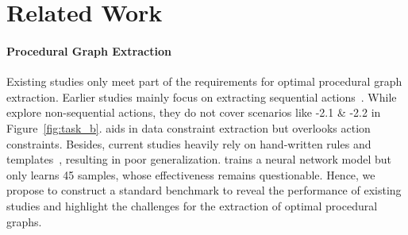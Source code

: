 

\section{Related Work}
\paragraph{Procedural Graph Extraction} 
Existing studies only meet part of the requirements for optimal procedural graph extraction. 
Earlier studies mainly focus on extracting sequential actions~\cite{pal2021constructing, lopez2021declarative, ren2023constructing}. 
While \citet{epure2015automatic, honkisz2018concept, bellan2022pet} explore non-sequential actions, they do not cover scenarios like \uppercase\expandafter{}-2.1 \& \uppercase\expandafter{}-2.2 in Figure~\ref{fig:task_b}. \citet{friedrich2011process} aids in data constraint extraction but overlooks action constraints. 
Besides, current studies heavily rely on hand-written rules and templates~\cite{epure2015automatic, honkisz2018concept}, resulting in poor generalization. \citet{bellan2022pet} trains a neural network model but only learns 45 samples, whose effectiveness remains questionable. 
Hence, we propose to construct a standard benchmark to reveal the performance of existing studies and highlight the challenges for the extraction of optimal procedural graphs. 



